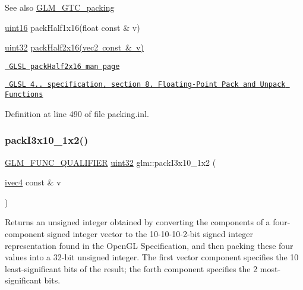 \begin{DoxySeeAlso}{See also}
\mbox{\hyperlink{group__gtc__packing}{G\+L\+M\+\_\+\+G\+T\+C\+\_\+packing}} 

\mbox{\hyperlink{group__gtc__type__precision_gad8c2939e1fdd8e5828b31d95c52255d5}{uint16}} pack\+Half1x16(float const \& v) 

\mbox{\hyperlink{group__gtc__type__precision_ga202b6a53c105fcb7e531f9b443518451}{uint32}} \mbox{\hyperlink{group__core__func__packing_ga082f6dd65f73a547ed3067ef00be036f}{pack\+Half2x16(vec2 const \& v)}} 

\href{http://www.opengl.org/sdk/docs/manglsl/xhtml/packHalf2x16.xml}{\texttt{ G\+L\+SL pack\+Half2x16 man page}} 

\href{http://www.opengl.org/registry/doc/GLSLangSpec.4.20.8.pdf}{\texttt{ G\+L\+SL 4.. specification, section 8. Floating-\/\+Point Pack and Unpack Functions}} 
\end{DoxySeeAlso}


Definition at line 490 of file packing.\+inl.

\mbox{\label{group__gtc__packing_ga032e18fa5bc5b8f3897104aeb2f1e195}} 
\subsubsection{\texorpdfstring{packI3x10\_1x2()}{packI3x10\_1x2()}}
{\footnotesize\ttfamily \mbox{\hyperlink{setup_8hpp_a33fdea6f91c5f834105f7415e2a64407}{G\+L\+M\+\_\+\+F\+U\+N\+C\+\_\+\+Q\+U\+A\+L\+I\+F\+I\+ER}} \mbox{\hyperlink{group__gtc__type__precision_ga202b6a53c105fcb7e531f9b443518451}{uint32}} glm\+::pack\+I3x10\+\_\+1x2 (\begin{DoxyParamCaption}\item[{\mbox{\hyperlink{group__core__types_gaa4560ddc50320ea8f8a70d5c9c249fea}{ivec4}} const \&}]{v }\end{DoxyParamCaption})}

Returns an unsigned integer obtained by converting the components of a four-\/component signed integer vector to the 10-\/10-\/10-\/2-\/bit signed integer representation found in the Open\+GL Specification, and then packing these four values into a 32-\/bit unsigned integer. The first vector component specifies the 10 least-\/significant bits of the result; the forth component specifies the 2 most-\/significant bits.

